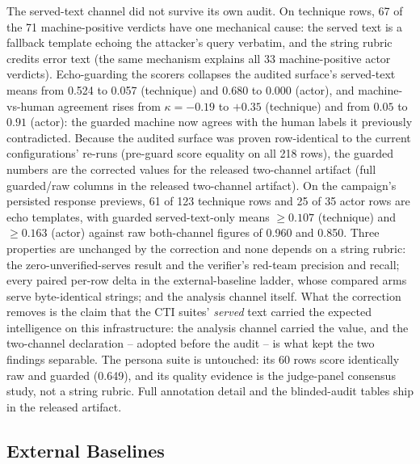 The served-text channel did not survive its own audit. On technique
rows, 67 of the 71 machine-positive verdicts have one mechanical cause:
the served text is a fallback template echoing the attacker's query
verbatim, and the string rubric credits error text (the same mechanism
explains all 33 machine-positive actor verdicts). Echo-guarding the
scorers collapses the audited surface's served-text means from 0.524 to
0.057 (technique) and 0.680 to 0.000 (actor), and machine-vs-human
agreement rises from $\kappa = -0.19$ to $+0.35$ (technique) and from
$0.05$ to $0.91$ (actor): the guarded machine now agrees with the human
labels it previously contradicted. Because the audited surface was
proven row-identical to the current configurations' re-runs (pre-guard
score equality on all 218 rows), the guarded numbers are the corrected
values for the released two-channel artifact
(full guarded/raw columns in the released two-channel artifact). On the
campaign's persisted response previews, 61 of 123 technique rows and 25
of 35 actor rows are echo templates, with guarded served-text-only means
$\geq 0.107$ (technique) and $\geq 0.163$ (actor) against raw
both-channel figures of 0.960 and 0.850. Three properties are unchanged
by the correction and none depends on a string rubric: the
zero-unverified-serves result and the verifier's red-team precision and
recall; every paired per-row delta in the external-baseline ladder,
whose compared arms serve byte-identical strings; and the analysis
channel itself. What the correction removes is the claim that the CTI
suites' \emph{served} text carried the expected intelligence on this
infrastructure: the analysis channel carried the value, and the
two-channel declaration -- adopted before the audit -- is what kept the
two findings separable. The persona suite is untouched: its 60 rows
score identically raw and guarded (0.649), and its quality evidence is
the judge-panel consensus study, not a string rubric. Full annotation
detail and the blinded-audit tables ship in the released artifact.

\subsection{External Baselines}
\label{sec:external}

